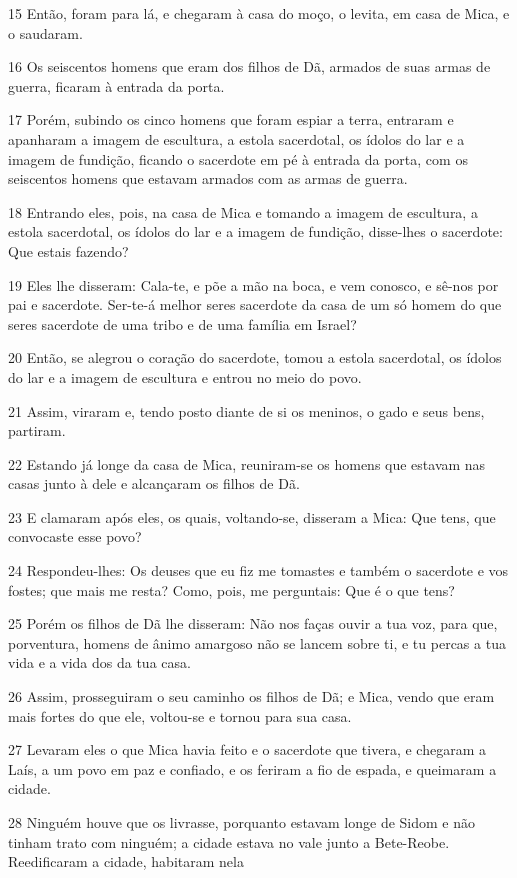 \par 15 Então, foram para lá, e chegaram à casa do moço, o levita, em casa de Mica, e o saudaram.
\par 16 Os seiscentos homens que eram dos filhos de Dã, armados de suas armas de guerra, ficaram à entrada da porta.
\par 17 Porém, subindo os cinco homens que foram espiar a terra, entraram e apanharam a imagem de escultura, a estola sacerdotal, os ídolos do lar e a imagem de fundição, ficando o sacerdote em pé à entrada da porta, com os seiscentos homens que estavam armados com as armas de guerra.
\par 18 Entrando eles, pois, na casa de Mica e tomando a imagem de escultura, a estola sacerdotal, os ídolos do lar e a imagem de fundição, disse-lhes o sacerdote: Que estais fazendo?
\par 19 Eles lhe disseram: Cala-te, e põe a mão na boca, e vem conosco, e sê-nos por pai e sacerdote. Ser-te-á melhor seres sacerdote da casa de um só homem do que seres sacerdote de uma tribo e de uma família em Israel?
\par 20 Então, se alegrou o coração do sacerdote, tomou a estola sacerdotal, os ídolos do lar e a imagem de escultura e entrou no meio do povo.
\par 21 Assim, viraram e, tendo posto diante de si os meninos, o gado e seus bens, partiram.
\par 22 Estando já longe da casa de Mica, reuniram-se os homens que estavam nas casas junto à dele e alcançaram os filhos de Dã.
\par 23 E clamaram após eles, os quais, voltando-se, disseram a Mica: Que tens, que convocaste esse povo?
\par 24 Respondeu-lhes: Os deuses que eu fiz me tomastes e também o sacerdote e vos fostes; que mais me resta? Como, pois, me perguntais: Que é o que tens?
\par 25 Porém os filhos de Dã lhe disseram: Não nos faças ouvir a tua voz, para que, porventura, homens de ânimo amargoso não se lancem sobre ti, e tu percas a tua vida e a vida dos da tua casa.
\par 26 Assim, prosseguiram o seu caminho os filhos de Dã; e Mica, vendo que eram mais fortes do que ele, voltou-se e tornou para sua casa.
\par 27 Levaram eles o que Mica havia feito e o sacerdote que tivera, e chegaram a Laís, a um povo em paz e confiado, e os feriram a fio de espada, e queimaram a cidade.
\par 28 Ninguém houve que os livrasse, porquanto estavam longe de Sidom e não tinham trato com ninguém; a cidade estava no vale junto a Bete-Reobe. Reedificaram a cidade, habitaram nela
